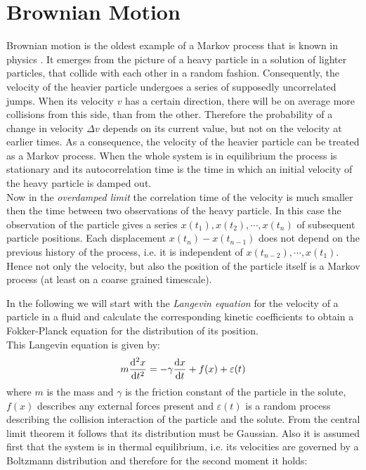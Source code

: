 \section{Brownian Motion}
\label{Brownian_Motion}
Brownian motion is the oldest example of a Markov process that is known in physics \cite{Einstein1905,Smoluchowski1906}. It emerges from the picture of a heavy particle in a solution of lighter particles, that collide with each other in a random fashion. Consequently, the velocity of the heavier particle undergoes a series of supposedly uncorrelated jumps. When its velocity $v$ has a certain direction, there will be on average more collisions from this side, than from the other. Therefore the probability of a change in velocity $\Delta v$ depends on its current value, but not on the velocity at earlier times. As a consequence, the velocity of the heavier particle can be treated as a Markov process. When the whole system is in equilibrium the process is stationary and its autocorrelation time is the time in which an initial velocity of the heavy particle is damped out. \\
Now in the \textit{overdamped limit} the correlation time of the velocity is much smaller then the time between two observations of the heavy particle. In this case the observation of the particle gives a series $x(t_1), x(t_2), \cdots , x(t_n)$ of subsequent particle positions. Each displacement $x(t_{n}) - x(t_{n-1})$ does not depend on the previous history of the process, i.e. it is independent of $x(t_{n-2}), \cdots , x(t_{1})$. Hence not only the velocity, but also the position of the particle itself is a Markov process (at least on a coarse grained timescale). 
\par
In the following we will start with the \emph{Langevin equation} \cite{Langevin1908} for the velocity of a particle in a fluid and calculate the corresponding kinetic coefficients to obtain a Fokker-Planck equation for the distribution of its position.\\ 
This Langevin equation is given by:
\begin{equation}
    m \frac{{\rm d}^2 x}{{\rm d}t^2} = -\gamma \frac{ {\rm d}x}{{\rm d}t} + f(x) + \varepsilon(t)
    \label{Langewin equation}
\end{equation}
where $m$ is the mass and $\gamma$ is the friction constant of the particle in the solute, $f(x)$ describes any external forces present and $\varepsilon(t)$ is a random process describing the collision interaction of the particle and the solute. From the central limit theorem it follows that its distribution must be Gaussian. Also it is assumed first that the system is in thermal equilibrium, i.e. its velocities are governed by a Boltzmann distribution and therefore for the second moment it holds:
